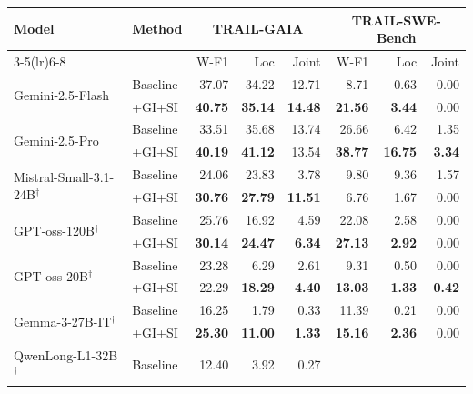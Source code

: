 \begin{table}[t]
\centering
\small
\setlength{\tabcolsep}{5pt}
\renewcommand{\arraystretch}{1.2}
\begin{tabular}{l l rrr @{\hspace{10pt}} rrr}
\toprule
\multirow{2}{*}{\textbf{Model}} &
\multirow{2}{*}{\textbf{Method}} &
\multicolumn{3}{c}{\textbf{TRAIL-GAIA}} &
\multicolumn{3}{c}{\textbf{TRAIL-SWE-Bench}} \\
\cmidrule(lr){3-5}\cmidrule(lr){6-8}
& & W-F1 & Loc & Joint & W-F1 & Loc & Joint \\
\midrule
\multirow{2}{*}{Gemini-2.5-Flash}
  & Baseline  & 37.07 & 34.22 & 12.71 &  8.71 &  0.63 & 0.00 \\
  & +GI+SI    & \textbf{40.75} & \textbf{35.14} & \textbf{14.48} &
               \textbf{21.56} & \textbf{3.44} & 0.00 \\[3pt]
\multirow{2}{*}{Gemini-2.5-Pro}
  & Baseline  & 33.51 & 35.68 & 13.74 &
               26.66 &  6.42 &  1.35 \\
  & +GI+SI    & \textbf{40.19} & \textbf{41.12} & 13.54 &
               \textbf{38.77} & \textbf{16.75} & \textbf{3.34} \\[3pt]
\multirow{2}{*}{Mistral-Small-3.1-24B$^{\dagger}$}
  & Baseline  & 24.06 & 23.83 &  3.78 &
               9.80 &  9.36 &  1.57 \\
  & +GI+SI    & \textbf{30.76} & \textbf{27.79} & \textbf{11.51} &
               6.76 &  1.67 &  0.00 \\[3pt]
\multirow{2}{*}{GPT-oss-120B$^{\dagger}$}
  & Baseline  & 25.76 & 16.92 &  4.59 &
               22.08 &  2.58 &  0.00 \\
  & +GI+SI    & \textbf{30.14} & \textbf{24.47} & \textbf{6.34} &
               \textbf{27.13} & \textbf{2.92} &  0.00 \\[3pt]
\multirow{2}{*}{GPT-oss-20B$^{\dagger}$}
  & Baseline  & 23.28 &  6.29 &  2.61 &
               9.31 &  0.50 &  0.00 \\
  & +GI+SI    & 22.29 & \textbf{18.29} & \textbf{4.40} &
               \textbf{13.03} & \textbf{1.33} & \textbf{0.42} \\[3pt]
\multirow{2}{*}{Gemma-3-27B-IT$^{\dagger}$}
  & Baseline  & 16.25 &  1.79 &  0.33 &
               11.39 &  0.21 &  0.00 \\
  & +GI+SI    & \textbf{25.30} & \textbf{11.00} & \textbf{1.33} &
               \textbf{15.16} & \textbf{2.36} &  0.00 \\[3pt]
\multirow{2}{*}{QwenLong-L1-32B$^{\dagger}$}
  & Baseline  & 12.40 &  3.92 &  0.27 &

\end{tabular}
\end{table}
